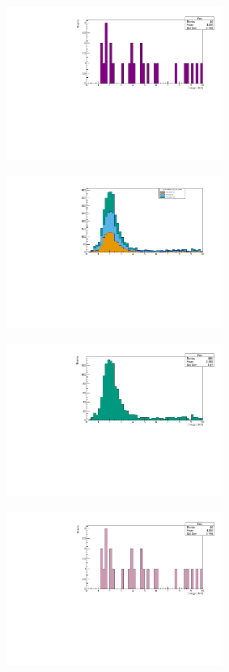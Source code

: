 \documentclass[12pt]{article}
\begin{document}
\begin{figure}[h]
  \begin{subfigure}{0.49\textwidth}
   \centering
   \includegraphics[width=0.95\linewidth,height=5cm]{./figures/validgenie~nue~Enu-Files~prod5p1-root.pdf}
   \caption{}
   \label{}
  \end{subfigure}
  \begin{subfigure}{0.49\textwidth}
   \centering
   \includegraphics[width=0.95\linewidth,height=5cm]{./figures/validgenie_numu_Enu_stacked.pdf}
   \caption{}
   \label{}
  \end{subfigure}
  \begin{subfigure}{0.49\textwidth}
   \centering
   \includegraphics[width=0.95\linewidth,height=5cm]{./figures/validgenie~Enu-Files~prod5p1-root.pdf}
   \caption{}
   \label{}
  \end{subfigure}
  \begin{subfigure}{0.49\textwidth}
   \centering
   \includegraphics[width=0.95\linewidth,height=5cm]{./figures/validgenie~nue~Enu-Files~valid-hist-root.pdf}

\end{subfigure}
\end{figure}
\end{document}
